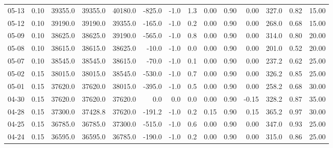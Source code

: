\begin{threeparttable}
{\begin{tabular}{lrrrrrrrrrrrrr}
  05-13 &     0.10 & 39355.0 & 39355.0 & 40180.0 &     -825.0 &                     -1.0 &                 1.3 &       0.00 &      0.90 &           0.00 &            327.0 &            0.82 &                  15.00 \\
  05-12 &     0.10 & 39190.0 & 39190.0 & 39355.0 &     -165.0 &                     -1.0 &                 0.2 &       0.00 &      0.90 &           0.00 &            268.0 &            0.68 &                  15.00 \\
  05-09 &     0.10 & 38625.0 & 38625.0 & 39190.0 &     -565.0 &                     -1.0 &                 0.8 &       0.00 &      0.90 &           0.00 &            314.0 &            0.80 &                  20.00 \\
  05-08 &     0.10 & 38615.0 & 38615.0 & 38625.0 &      -10.0 &                     -1.0 &                 0.0 &       0.00 &      0.90 &           0.00 &            201.0 &            0.52 &                  20.00 \\
  05-07 &     0.10 & 38545.0 & 38545.0 & 38615.0 &      -70.0 &                     -1.0 &                 0.1 &       0.00 &      0.90 &           0.00 &            237.2 &            0.62 &                  25.00 \\
  05-02 &     0.15 & 38015.0 & 38015.0 & 38545.0 &     -530.0 &                     -1.0 &                 0.7 &       0.00 &      0.90 &           0.00 &            326.2 &            0.85 &                  25.00 \\
  05-01 &     0.15 & 37620.0 & 37620.0 & 38015.0 &     -395.0 &                     -1.0 &                 0.5 &       0.00 &      0.90 &           0.00 &            258.2 &            0.68 &                  30.00 \\
  04-30 &     0.15 & 37620.0 & 37620.0 & 37620.0 &        0.0 &                      0.0 &                 0.0 &       0.00 &      0.90 &          -0.15 &            328.2 &            0.87 &                  35.00 \\
  04-28 &     0.15 & 37300.0 & 37428.8 & 37620.0 &     -191.2 &                     -1.0 &                 0.2 &       0.15 &      0.90 &           0.15 &            365.2 &            0.97 &                  30.00 \\
  04-25 &     0.15 & 36785.0 & 36785.0 & 37300.0 &     -515.0 &                     -1.0 &                 0.6 &       0.00 &      0.90 &           0.00 &            347.0 &            0.93 &                  25.00 \\
  04-24 &     0.15 & 36595.0 & 36595.0 & 36785.0 &     -190.0 &                     -1.0 &                 0.2 &       0.00 &      0.90 &           0.00 &            315.0 &            0.86 &                  25.00 \\

\end{tabular}}
\end{threeparttable}
